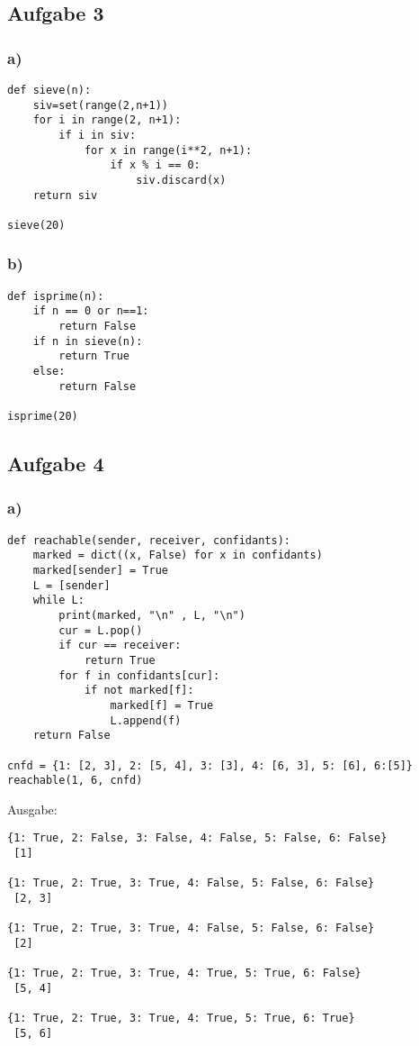 \documentclass{scrartcl}
\begin{document}
\subsection*{Aufgabe 3}
\subsubsection*{a)}
\begin{lstlisting}
def sieve(n):
    siv=set(range(2,n+1))
    for i in range(2, n+1):
        if i in siv:
            for x in range(i**2, n+1):
                if x % i == 0:
                    siv.discard(x)
    return siv

sieve(20)
\end{lstlisting}

\subsubsection*{b)}
\begin{lstlisting}
def isprime(n):
    if n == 0 or n==1:
        return False
    if n in sieve(n):
        return True
    else:
        return False

isprime(20)
\end{lstlisting}

\subsection*{Aufgabe 4}
\subsubsection*{a)}
\begin{lstlisting}
def reachable(sender, receiver, confidants):
    marked = dict((x, False) for x in confidants)
    marked[sender] = True
    L = [sender]
    while L:
        print(marked, "\n" , L, "\n")
        cur = L.pop()
        if cur == receiver:
            return True
        for f in confidants[cur]:
            if not marked[f]:
                marked[f] = True
                L.append(f)
    return False

cnfd = {1: [2, 3], 2: [5, 4], 3: [3], 4: [6, 3], 5: [6], 6:[5]}
reachable(1, 6, cnfd)
\end{lstlisting}
Ausgabe:
\begin{lstlisting}
{1: True, 2: False, 3: False, 4: False, 5: False, 6: False} 
 [1] 

{1: True, 2: True, 3: True, 4: False, 5: False, 6: False} 
 [2, 3] 

{1: True, 2: True, 3: True, 4: False, 5: False, 6: False} 
 [2] 

{1: True, 2: True, 3: True, 4: True, 5: True, 6: False} 
 [5, 4] 

{1: True, 2: True, 3: True, 4: True, 5: True, 6: True} 
 [5, 6] 
\end{lstlisting}
\end{document}
